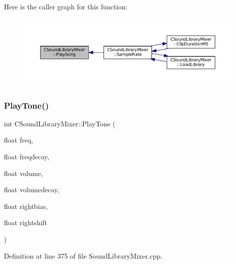 Here is the caller graph for this function\+:
\nopagebreak
\begin{figure}[H]
\begin{center}
\leavevmode
\includegraphics[width=350pt]{classCSoundLibraryMixer_ad8fdd1f573967a8124cd4bc4a8c29ea1_icgraph}
\end{center}
\end{figure}
\hypertarget{classCSoundLibraryMixer_a48bf99193d92c07a5c5229d58a10d9fe}{}\label{classCSoundLibraryMixer_a48bf99193d92c07a5c5229d58a10d9fe} 
\subsubsection{\texorpdfstring{Play\+Tone()}{PlayTone()}}
{\footnotesize\ttfamily int C\+Sound\+Library\+Mixer\+::\+Play\+Tone (\begin{DoxyParamCaption}\item[{float}]{freq,  }\item[{float}]{freqdecay,  }\item[{float}]{volume,  }\item[{float}]{volumedecay,  }\item[{float}]{rightbias,  }\item[{float}]{rightshift }\end{DoxyParamCaption})}



Definition at line 375 of file Sound\+Library\+Mixer.\+cpp.


